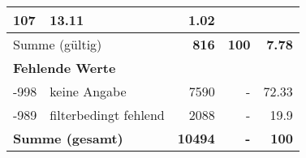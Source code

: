 \begin{longtable}{lXrrr}
       \num{107} &
       \num[round-mode=places,round-precision=2]{13,11} &
         \num[round-mode=places,round-precision=2]{1,02} \\
     \midrule
     \multicolumn{2}{l}{Summe (gültig)} &
       \textbf{\num{816}} &
     \textbf{100} &
       \textbf{\num[round-mode=places,round-precision=2]{7,78}} \\
     \multicolumn{5}{l}{\textbf{Fehlende Werte}}\\
       -998 &
       keine Angabe &
         \num{7590} &
        - &
         \num[round-mode=places,round-precision=2]{72,33} \\
       -989 &
       filterbedingt fehlend &
         \num{2088} &
        - &
         \num[round-mode=places,round-precision=2]{19,9} \\
     \midrule
     \multicolumn{2}{l}{\textbf{Summe (gesamt)}} &
          \textbf{\num{10494}} &
        \textbf{-} &
        \textbf{100} \\
     \bottomrule
     \end{longtable}
     
